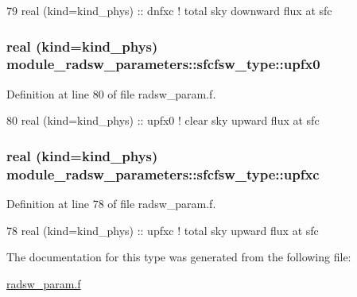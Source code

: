 \begin{DoxyCode}
79         \textcolor{keywordtype}{real (kind=kind\_phys)} :: dnfxc         \textcolor{comment}{! total sky downward flux at sfc}
\end{DoxyCode}
\subsubsection[{\texorpdfstring{upfx0}{upfx0}}]{\setlength{\rightskip}{0pt plus 5cm}real (kind=kind\+\_\+phys) module\+\_\+radsw\+\_\+parameters\+::sfcfsw\+\_\+type\+::upfx0}\hypertarget{structmodule__radsw__parameters_1_1sfcfsw__type_a6bfa85d5917ebc4ebc4ef079e3cf3eca}{}\label{structmodule__radsw__parameters_1_1sfcfsw__type_a6bfa85d5917ebc4ebc4ef079e3cf3eca}


Definition at line 80 of file radsw\+\_\+param.\+f.


\begin{DoxyCode}
80         \textcolor{keywordtype}{real (kind=kind\_phys)} :: upfx0         \textcolor{comment}{! clear sky upward flux at sfc}
\end{DoxyCode}
\subsubsection[{\texorpdfstring{upfxc}{upfxc}}]{\setlength{\rightskip}{0pt plus 5cm}real (kind=kind\+\_\+phys) module\+\_\+radsw\+\_\+parameters\+::sfcfsw\+\_\+type\+::upfxc}\hypertarget{structmodule__radsw__parameters_1_1sfcfsw__type_a89e2285e3148921e989cb27cda4294a1}{}\label{structmodule__radsw__parameters_1_1sfcfsw__type_a89e2285e3148921e989cb27cda4294a1}


Definition at line 78 of file radsw\+\_\+param.\+f.


\begin{DoxyCode}
78         \textcolor{keywordtype}{real (kind=kind\_phys)} :: upfxc         \textcolor{comment}{! total sky upward flux at sfc}
\end{DoxyCode}


The documentation for this type was generated from the following file\+:\begin{DoxyCompactItemize}
\item 
\hyperlink{radsw__param_8f}{radsw\+\_\+param.\+f}\end{DoxyCompactItemize}
